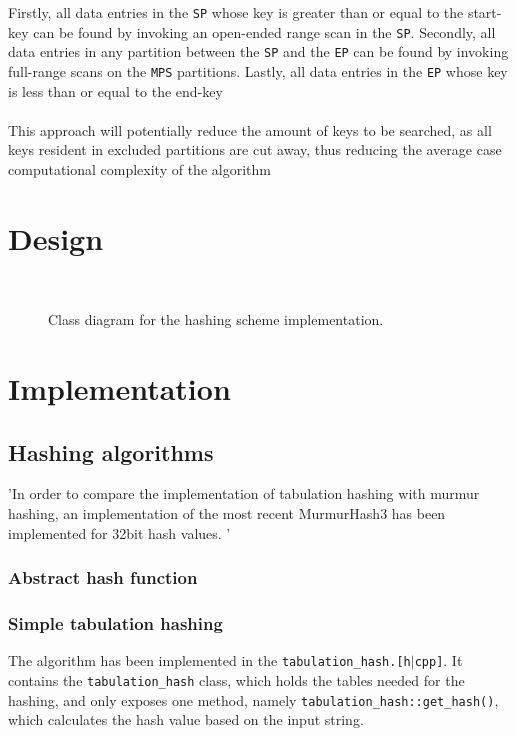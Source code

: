 \documentclass[11pt]{article} %
\begin{document}
Firstly, all data entries in the \verb|SP| whose key is greater than or equal to the start-key can be found by invoking an open-ended range scan in the \verb|SP|. Secondly, all data entries in any partition between the \verb|SP| and the \verb|EP| can be found by invoking full-range scans on the \verb|MPS| partitions. Lastly, all data entries in the \verb|EP| whose key is less than or equal to the end-key\\\\
This approach will potentially reduce the amount of keys to be searched, as all keys resident in excluded partitions are cut away, thus reducing the average case computational complexity of the algorithm
\newpage

\section{Design}
\begin{figure}[H]
  \\
  \caption{Class diagram for the hashing scheme implementation.}\label{fig:UML_index_and_func}
\newpage
\end{figure}
\section{Implementation}
\subsection{Hashing algorithms}
'In order to compare the implementation of tabulation hashing with murmur hashing, an implementation of the most recent MurmurHash3 has been implemented for 32bit hash values. '\\
\subsubsection{Abstract hash function}
\subsubsection{Simple tabulation hashing}
The algorithm has been implemented in the \verb|tabulation_hash.[h|$\vert$\verb|cpp]|. It contains the \verb|tabulation_hash| class, which holds the tables needed for the hashing, and only exposes one method, namely \verb|tabulation_hash::get_hash()|, which calculates the hash value based on the input string.
\end{document}
